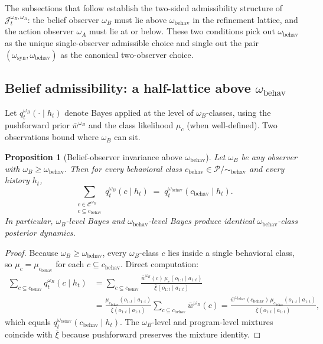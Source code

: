 \documentclass[11pt]{article}
\newtheorem{proposition}[theorem]{Proposition}
\theoremstyle{definition}
\theoremstyle{remark}
\newcommand{\Ccal}{\mathcal{C}}
\newcommand{\Pcal}{\mathcal{P}}
\newcommand{\barxi}{\bar{\xi}}
\begin{document}
The subsections that follow establish the two-sided admissibility structure of $\mathcal J_t^{\omega_B,\omega_A}$: the belief observer $\omega_B$ must lie above $\omega_{\mathrm{behav}}$ in the refinement lattice, and the action observer $\omega_A$ must lie at or below. These two conditions pick out $\omega_{\mathrm{behav}}$ as the unique single-observer admissible choice and single out the pair $(\omega_{\mathrm{syn}},\omega_{\mathrm{behav}})$ as the canonical two-observer choice.

\subsection{Belief admissibility: a half-lattice above $\omega_{\mathrm{behav}}$}
\label{sec:belief-admissibility}

Let $q_t^{\omega_B}(\cdot\mid h_t)$ denote Bayes applied at the level of $\omega_B$-classes, using the pushforward prior $\bar w^{\omega_B}$ and the class likelihood $\mu_c$ (when well-defined). Two observations bound where $\omega_B$ can sit.

\begin{proposition}[Belief-observer invariance above $\omega_{\mathrm{behav}}$]
\label{prop:belief-invariance-above}
Let $\omega_B$ be any observer with $\omega_B\ge\omega_{\mathrm{behav}}$. Then for every behavioral class $c_{\mathrm{behav}}\in\Pcal/\!\sim_{\mathrm{behav}}$ and every history $h_t$,
\[
\sum_{\substack{c\in\Ccal^{\omega_B}\\ c\subseteq c_{\mathrm{behav}}}}q_t^{\omega_B}(c\mid h_t)\;=\;q_t^{\omega_{\mathrm{behav}}}(c_{\mathrm{behav}}\mid h_t).
\]
In particular, $\omega_B$-level Bayes and $\omega_{\mathrm{behav}}$-level Bayes produce identical $\omega_{\mathrm{behav}}$-class posterior dynamics.
\end{proposition}

\begin{proof}
Because $\omega_B\ge\omega_{\mathrm{behav}}$, every $\omega_B$-class $c$ lies inside a single behavioral class, so $\mu_c=\mu_{c_{\mathrm{behav}}}$ for each $c\subseteq c_{\mathrm{behav}}$. Direct computation:
\begin{align*}
\sum_{c\subseteq c_{\mathrm{behav}}}q_t^{\omega_B}(c\mid h_t)
&=\sum_{c\subseteq c_{\mathrm{behav}}}\frac{\bar w^{\omega_B}(c)\,\mu_c(o_{1:t}\mid a_{1:t})}{\barxi(o_{1:t}\mid a_{1:t})}\\
&=\frac{\mu_{c_{\mathrm{behav}}}(o_{1:t}\mid a_{1:t})}{\barxi(o_{1:t}\mid a_{1:t})}\sum_{c\subseteq c_{\mathrm{behav}}}\bar w^{\omega_B}(c)
=\frac{\bar w^{\omega_{\mathrm{behav}}}(c_{\mathrm{behav}})\,\mu_{c_{\mathrm{behav}}}(o_{1:t}\mid a_{1:t})}{\barxi(o_{1:t}\mid a_{1:t})},
\end{align*}
which equals $q_t^{\omega_{\mathrm{behav}}}(c_{\mathrm{behav}}\mid h_t)$. The $\omega_B$-level and program-level mixtures coincide with $\barxi$ because pushforward preserves the mixture identity.
\end{proof}
\end{document}
